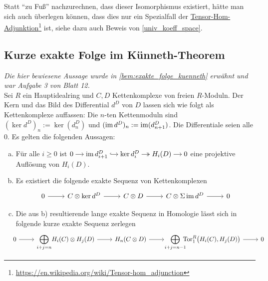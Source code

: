 Statt \enquote{zu Fuß} nachzurechnen, dass dieser Isomorphismus existiert, hätte man sich auch überlegen können, dass dies nur ein Spezialfall der \href{https://en.wikipedia.org/wiki/Tensor-hom_adjunction}{Tensor-Hom-Adjunktion}\footnote{\url{https://en.wikipedia.org/wiki/Tensor-hom_adjunction}} ist, siehe dazu auch Beweis von \autoref{univ_koeff_space}.

\subsection{Kurze exakte Folge im Künneth-Theorem} %
\label{sub:aufg3_blatt12}
\emph{Die hier bewiesene Aussage wurde in \autoref{bem:exakte_folge_kuenneth} erwähnt und war Aufgabe 3 von Blatt 12.}\smallskip\\
Sei $R$ ein Hauptidealring und $C,D$ Kettenkomplexe von freien $R$-Moduln.
Der Kern und das Bild des Differential $d^D$ von $D$ lassen sich wie folgt als Kettenkomplexe auffassen:
Die $n$-ten Kettenmoduln sind $(\ker d^D)_n := \ker(d^D_n)$ und $(\operatorname{im} d^D)_n := \operatorname{im} (d^D_{n+1})$.
Die Differentiale seien alle $0$.
Es gelten die folgenden Aussagen:
\begin{enumerate}[a)]
	\item Für alle $i\ge0$ ist 
	\(
		\begin{tikzcd}[cramped,sep=small]
			0 \rar & \im d_{i+1}^D \rar[hook] & \ker d_i^D \rar[two heads] & H_i(D) \rar & 0
 		\end{tikzcd}
	\)
	eine projektive Auflösung von $H_i(D)$.
	\item Es existiert die folgende exakte Sequenz von Kettenkomplexen
	\[
		\begin{tikzcd}
			0 \rar & C \otimes \ker d^D \rar & C \otimes D \rar & C \otimes \Sigma \im d^D \rar & 0
		\end{tikzcd}
	\]
	\item Die aus b) resultierende lange exakte Sequenz in Homologie lässt sich in folgende kurze exakte Sequenz zerlegen
	\[
		\hspace{-1em}\begin{tikzcd}
			0 \rar & \displaystyle\bigoplus_{i+j=n} \!H_i(C) \otimes H_j(D) \rar & H_n(C \otimes D) \rar &\!\!\displaystyle \bigoplus_{i+j=n-1}\hspace{-1.5ex} \Tor_1^R \enbrace[\big]{H_i(C),H_j(D)} \rar & 0
		\end{tikzcd}
	\]
\end{enumerate} 

